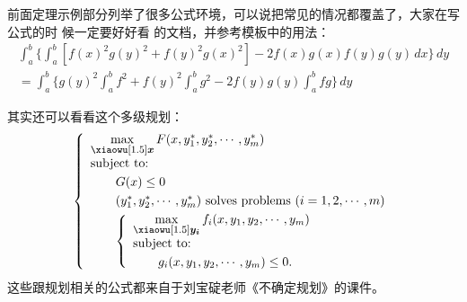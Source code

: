 前面定理示例部分列举了很多公式环境，可以说把常见的情况都覆盖了，大家在写公式的时
候一定要好好看  的文档，并参考模板中的用法：
\begin{multline*}%
\int_a^b\biggl\{\int_a^b[f(x)^2g(y)^2+f(y)^2g(x)^2]
 -2f(x)g(x)f(y)g(y)\,dx\biggr\}\,dy \\
 =\int_a^b\biggl\{g(y)^2\int_a^bf^2+f(y)^2
  \int_a^b g^2-2f(y)g(y)\int_a^b fg\biggr\}\,dy
\end{multline*}

其实还可以看看这个多级规划：
\begin{equation}\label{bilevel}
\left\{\begin{array}{l}
\max\limits_{{\mbox{\footnotesize\boldmath $x$}}} F(x,y_1^*,y_2^*,\cdots,y_m^*)\\[0.2cm]
\mbox{subject to:}\\[0.1cm]
\qquad G(x)\le 0\\[0.1cm]
\qquad(y_1^*,y_2^*,\cdots,y_m^*)\mbox{ solves problems }(i=1,2,\cdots,m)\\[0.1cm]
\qquad\left\{\begin{array}{l}
    \max\limits_{{\mbox{\footnotesize\boldmath $y_i$}}}f_i(x,y_1,y_2,\cdots,y_m)\\[0.2cm]
    \mbox{subject to:}\\[0.1cm]
    \qquad g_i(x,y_1,y_2,\cdots,y_m)\le 0.
    \end{array}\right.
\end{array}\right.
\end{equation}
这些跟规划相关的公式都来自于刘宝碇老师《不确定规划》的课件。
